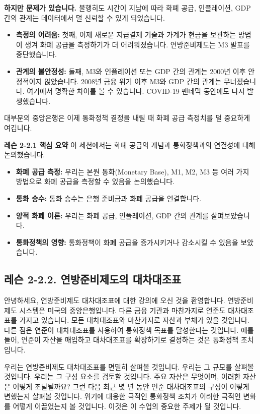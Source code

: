 \documentclass[11pt,a4paper]{article}
\theoremstyle{definition}
\begin{document}
\textbf{하지만 문제가 있습니다.}
불행히도 시간이 지남에 따라 화폐 공급, 인플레이션, GDP 간의 관계는 데이터에서 덜 신뢰할 수 있게 되었습니다.
\begin{itemize}
    \item \textbf{측정의 어려움:} 첫째, 이제 새로운 지급결제 기술과 가계가 현금을 보관하는 방법이 생겨 화폐 공급을 측정하기가 더 어려워졌습니다. 연방준비제도는 M3 발표를 중단했습니다.
    \item \textbf{관계의 불안정성:} 둘째, M3와 인플레이션 또는 GDP 간의 관계는 2000년 이후 안정적이지 않았습니다. 2008년 금융 위기 이후 M3와 GDP 간의 관계는 무너졌습니다. 여기에서 명확한 차이를 볼 수 있습니다. COVID-19 팬데믹 동안에도 다시 발생했습니다.
\end{itemize}
대부분의 중앙은행은 이제 통화정책 결정을 내릴 때 화폐 공급 측정치를 덜 중요하게 여깁니다.

\begin{summarybox}
\textbf{레슨 2-2.1 핵심 요약}
이 세션에서는 화폐 공급의 개념과 통화정책과의 연결성에 대해 논의했습니다.
\begin{itemize}
    \item \textbf{화폐 공급 측정:} 우리는 본원 통화(Monetary Base), M1, M2, M3 등 여러 가지 방법으로 화폐 공급을 측정할 수 있음을 논의했습니다.
    \item \textbf{통화 승수:} 통화 승수는 은행 준비금과 화폐 공급을 연결합니다.
    \item \textbf{양적 화폐 이론:} 우리는 화폐 공급, 인플레이션, GDP 간의 관계를 살펴보았습니다.
    \item \textbf{통화정책의 영향:} 통화정책이 화폐 공급을 증가시키거나 감소시킬 수 있음을 보았습니다.
\end{itemize}
\end{summarybox}

\newpage
\subsection{레슨 2-2.2. 연방준비제도의 대차대조표}

안녕하세요, 연방준비제도 대차대조표에 대한 강의에 오신 것을 환영합니다. 연방준비제도 시스템은 미국의 중앙은행입니다. 다른 금융 기관과 마찬가지로 연준도 대차대조표를 가지고 있습니다. 모든 대차대조표와 마찬가지로 자산과 부채가 있을 것입니다. 다른 점은 연준이 대차대조표를 사용하여 통화정책 목표를 달성한다는 것입니다. 예를 들어, 연준이 자산을 매입하고 대차대조표를 확장하기로 결정하는 것은 통화정책 조치입니다.

우리는 연방준비제도 대차대조표를 면밀히 살펴볼 것입니다. 우리는 그 규모를 살펴볼 것입니다. 우리는 그 구성 요소를 검토할 것입니다. 주요 자산은 무엇이며, 이러한 자산은 어떻게 조달될까요? 그런 다음 최근 몇 년 동안 연준 대차대조표의 구성이 어떻게 변했는지 살펴볼 것입니다. 위기에 대응한 극적인 통화정책 조치가 이러한 극적인 변화를 어떻게 이끌었는지 볼 것입니다. 이것은 이 수업의 중요한 주제가 될 것입니다.
\end{document}
